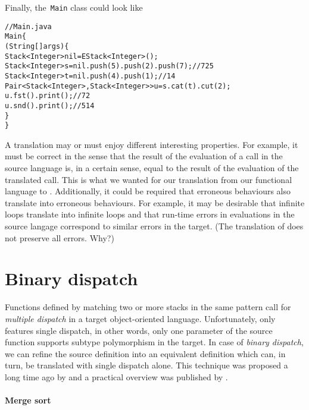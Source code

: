 Finally, the~\texttt{Main} class could look like
\begin{alltt}
// Main.java
\public \class Main \{
  \public \static \void \main (String[] args) \{
    Stack<Integer> nil = \new EStack<Integer>();
    Stack<Integer> s = nil.push(5).push(2).push(7);\hfill// 7 2 5
    Stack<Integer> t = nil.push(4).push(1);\hfill// 1 4
    Pair<Stack<Integer>,Stack<Integer>> u = s.cat(t).cut(2);
    u.fst().print();\hfill// 7 2
    u.snd().print();\hfill// 5 1 4
  \}
\}
\end{alltt}
A translation may or must enjoy different interesting properties. For
example, it must be correct in the sense that the result of the
evaluation of a call in the source language is, in a certain sense,
equal to the result of the evaluation of the translated call. This is
what we wanted for our translation from our functional language to
\Java. Additionally, it could be required that erroneous behaviours
also translate into erroneous behaviours. For example, it may be
desirable that infinite loops translate into infinite loops and that
run\hyp{}time errors in evaluations in the source langage correspond
to similar errors in the target. (The translation of  does
not preserve all errors. Why?)


\section{Binary dispatch}

Functions defined by matching two or more stacks in the same pattern
call for \emph{multiple dispatch} in a target object\hyp{}oriented
language. Unfortunately, \Java only features single dispatch, in other
words, only one parameter of the source function supports subtype
polymorphism in the target. In case of \emph{binary
  dispatch}, we can refine the
source definition into an equivalent definition which can, in turn, be
translated with single dispatch alone. This technique was proposed a
long time ago by \cite{Ingalls_1986} and a practical overview was
published by \cite{MuscheviciPotaninTemperoNoble_2008}.

\paragraph{Merge sort}

